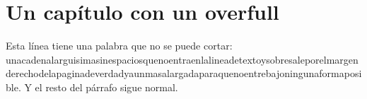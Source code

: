 \section{Un capítulo con un overfull}
Esta línea tiene una palabra que no se puede cortar: \mbox{unacadenalarguisimasinespaciosquenoentraenlalineadetextoysobresaleporelmargenderechodelapaginadeverdadyaunmasalargadaparaquenoentrebajoningunaformaposible}. Y el resto del párrafo sigue normal.
